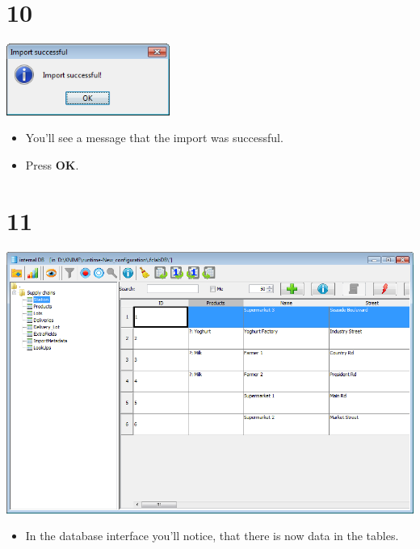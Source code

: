 \documentclass{beamer}
\begin{document}
\section{10}
\begin{frame}
	\begin{center}
  		\includegraphics[width=0.4\textwidth]{10.png}
	\end{center}
	\begin{itemize}
		\item You'll see a message that the import was successful.
		\item Press \textbf{OK}.
	\end{itemize}
\end{frame}

\section{11}
\begin{frame}
	\begin{center}
  		\includegraphics[height=0.5\textheight]{11.png}
	\end{center}
	\begin{itemize}
		\item In the database interface you'll notice, that there is now data in the tables.
	\end{itemize}
\end{frame}
\end{document}
